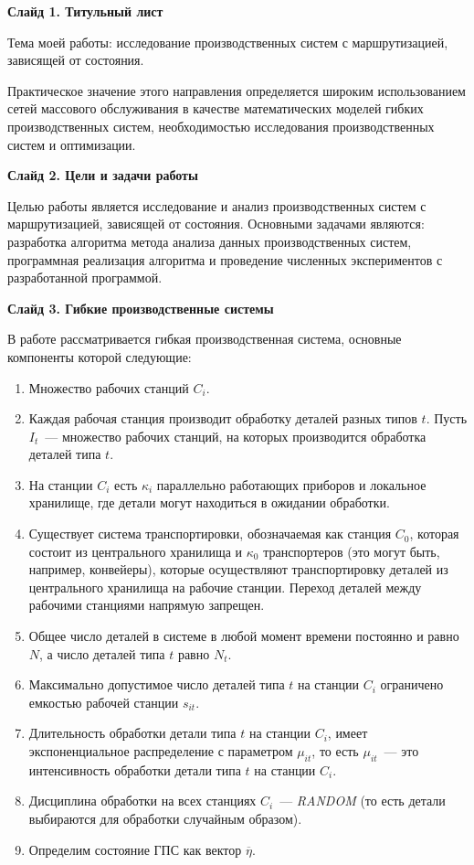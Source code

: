 \documentclass[a4paper,14pt]{extarticle}
\theoremstyle{note}
\begin{document}
\textbf{Слайд 1. Титульный лист}

Тема моей работы: исследование производственных систем с маршрутизацией, зависящей от состояния.

Практическое значение этого направления определяется широким использованием сетей массового обслуживания в качестве математических моделей гибких производственных систем, необходимостью исследования производственных систем и оптимизации.

\textbf{Слайд 2. Цели и задачи работы}

Целью работы является исследование и анализ производственных систем с маршрутизацией, зависящей от состояния. Основными задачами являются: разработка алгоритма метода анализа данных производственных систем, программная реализация алгоритма и проведение численных экспериментов с разработанной программой.


\textbf{Слайд 3. Гибкие производственные системы}

В работе рассматривается гибкая производственная система, основные компоненты которой следующие:
\begin{enumerate}
\item Множество рабочих станций $C_i$.

\item Каждая рабочая станция производит обработку деталей разных типов $t$. Пусть $I_t$~--- множество рабочих станций, на которых производится обработка деталей типа $t$.

\item На станции $C_i$ есть $\kappa_i$ параллельно работающих приборов и локальное хранилище, где детали могут находиться в ожидании обработки.

\item Существует система транспортировки, обозначаемая как станция $C_0$, которая состоит из центрального хранилища и $\kappa_0$ транспортеров (это могут быть, например, конвейеры), которые осуществляют транспортировку деталей из центрального хранилища на рабочие станции. Переход деталей между рабочими станциями напрямую запрещен.

\item Общее число деталей в системе в любой момент времени постоянно и равно $N$, а число деталей типа $t$ равно $N_t$.

\item Максимально допустимое число деталей типа $t$ на станции $C_i$ ограничено емкостью рабочей станции $s_{it}$.

\item Длительность обработки детали типа $t$ на станции $C_i$, имеет экспоненциальное распределение с параметром $\mu_{it}$, то есть $\mu_{it}$~--- это интенсивность обработки детали типа $t$ на станции $C_i$.

\item Дисциплина обработки на всех станциях $C_i$~--- \textit{RANDOM} (то есть детали выбираются для обработки случайным образом).

\item Определим состояние ГПС как вектор $\overline{\eta}$.
\end{enumerate}
\end{document}
